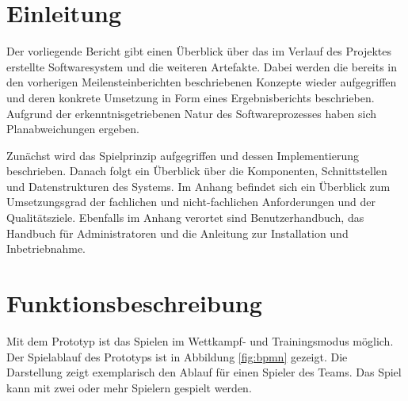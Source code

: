 \documentclass[a4paper,11pt,listof=numbered,glossary=totoc,parskip=half,toc=bib]{scrreprt}
\begin{document}
	\newpage
	\renewcommand \thechapter{\arabic{chapter}}
	\setcounter{chapter}{0}
	
	\chapter{Einleitung}
	Der vorliegende Bericht gibt einen Überblick über das im Verlauf des Projektes erstellte Softwaresystem und die weiteren Artefakte. Dabei werden die bereits in den vorherigen Meilensteinberichten beschriebenen Konzepte wieder aufgegriffen und deren konkrete Umsetzung in Form eines Ergebnisberichts beschrieben. Aufgrund der erkenntnisgetriebenen Natur des Softwareprozesses haben sich Planabweichungen ergeben.
	
	Zunächst wird das Spielprinzip aufgegriffen und dessen Implementierung beschrieben. Danach folgt ein Überblick über die Komponenten, Schnittstellen und Datenstrukturen des Systems. Im Anhang befindet sich ein Überblick zum Umsetzungsgrad der fachlichen und nicht-fachlichen Anforderungen und der Qualitätsziele. Ebenfalls im Anhang verortet sind Benutzerhandbuch, das Handbuch für Administratoren und die Anleitung zur Installation und Inbetriebnahme.
	
	\chapter{Funktionsbeschreibung}
	Mit dem Prototyp ist das Spielen im Wettkampf- und Trainingsmodus möglich. Der Spielablauf des Prototyps ist in Abbildung \ref{fig:bpmn} gezeigt. 
	Die Darstellung zeigt exemplarisch den Ablauf für einen Spieler des Teams. Das Spiel kann mit zwei oder mehr Spielern gespielt werden. 
		
\end{document}
